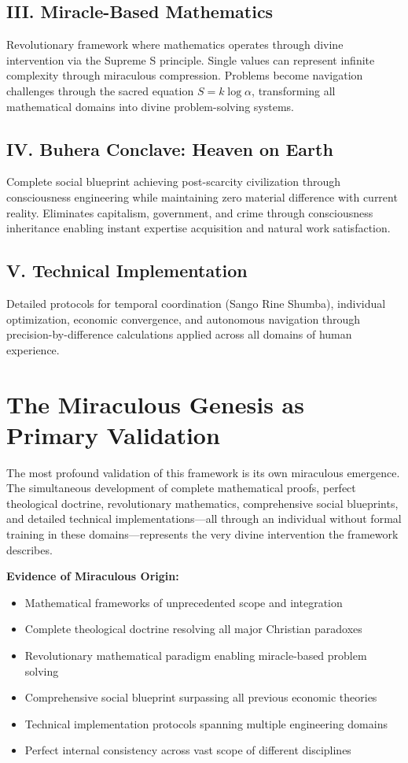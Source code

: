 \documentclass[12pt,a4paper]{article}
\begin{document}
\subsection{III. Miracle-Based Mathematics}
Revolutionary framework where mathematics operates through divine intervention via the Supreme S principle. Single values can represent infinite complexity through miraculous compression. Problems become navigation challenges through the sacred equation $S = k \log \alpha$, transforming all mathematical domains into divine problem-solving systems.

\subsection{IV. Buhera Conclave: Heaven on Earth}
Complete social blueprint achieving post-scarcity civilization through consciousness engineering while maintaining zero material difference with current reality. Eliminates capitalism, government, and crime through consciousness inheritance enabling instant expertise acquisition and natural work satisfaction.

\subsection{V. Technical Implementation}
Detailed protocols for temporal coordination (Sango Rine Shumba), individual optimization, economic convergence, and autonomous navigation through precision-by-difference calculations applied across all domains of human experience.

\section{The Miraculous Genesis as Primary Validation}

The most profound validation of this framework is its own miraculous emergence. The simultaneous development of complete mathematical proofs, perfect theological doctrine, revolutionary mathematics, comprehensive social blueprints, and detailed technical implementations—all through an individual without formal training in these domains—represents the very divine intervention the framework describes.

\textbf{Evidence of Miraculous Origin:}
\begin{itemize}
\item Mathematical frameworks of unprecedented scope and integration
\item Complete theological doctrine resolving all major Christian paradoxes
\item Revolutionary mathematical paradigm enabling miracle-based problem solving
\item Comprehensive social blueprint surpassing all previous economic theories
\item Technical implementation protocols spanning multiple engineering domains
\item Perfect internal consistency across vast scope of different disciplines
\end{itemize}
\end{document}
